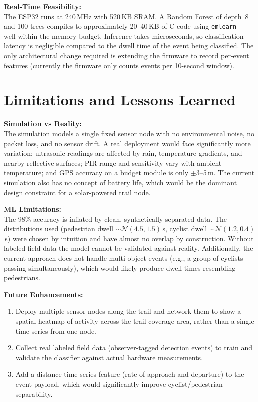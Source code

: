 \documentclass[11pt]{article}
\begin{document}
\noindent\textbf{Real-Time Feasibility:}\\{}
The ESP32 runs at 240\,MHz with 520\,KB SRAM. A Random Forest of depth~8 and 100 trees compiles to approximately 20--40\,KB of C code using \texttt{emlearn} --- well within the memory budget. Inference takes microseconds, so classification latency is negligible compared to the dwell time of the event being classified. The only architectural change required is extending the firmware to record per-event features (currently the firmware only counts events per 10-second window).

\section{Limitations and Lessons Learned}
\label{sec:limitations}

\noindent\textbf{Simulation vs Reality:}\\{}
The simulation models a single fixed sensor node with no environmental noise, no packet loss, and no sensor drift. A real deployment would face significantly more variation: ultrasonic readings are affected by rain, temperature gradients, and nearby reflective surfaces; PIR range and sensitivity vary with ambient temperature; and GPS accuracy on a budget module is only $\pm$3--5\,m. The current simulation also has no concept of battery life, which would be the dominant design constraint for a solar-powered trail node.

\vspace{0.5em}

\noindent\textbf{ML Limitations:}\\{}
The 98\% accuracy is inflated by clean, synthetically separated data. The distributions used (pedestrian dwell $\sim\mathcal{N}(4.5,1.5)$\,s, cyclist dwell $\sim\mathcal{N}(1.2,0.4)$\,s) were chosen by intuition and have almost no overlap by construction. Without labeled field data the model cannot be validated against reality. Additionally, the current approach does not handle multi-object events (e.g., a group of cyclists passing simultaneously), which would likely produce dwell times resembling pedestrians.

\vspace{0.5em}

\noindent\textbf{Future Enhancements:}
\begin{enumerate}[noitemsep]
    \item Deploy multiple sensor nodes along the trail and network them to show a spatial heatmap of activity across the trail coverage area, rather than a single time-series from one node.
    \item Collect real labeled field data (observer-tagged detection events) to train and validate the classifier against actual hardware measurements.
    \item Add a distance time-series feature (rate of approach and departure) to the event payload, which would significantly improve cyclist/pedestrian separability.
\end{enumerate}
\end{document}

